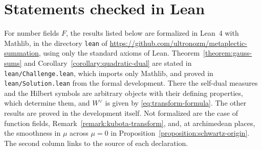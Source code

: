 \documentclass[reqno]{amsart}
\theoremstyle{plain}
\theoremstyle{definition}
\theoremstyle{itplain}
\newcommand{\leanrepo}{https://github.com/ultronozm/metaplectic-summation}
\numberwithin{equation}{section}
\numberwithin{theorem}{section}
\begin{document}
\section{Statements checked in Lean}\label{sec:lean}
\sloppy
For number fields $F$, the results listed below are formalized in Lean~4 with Mathlib, in the directory \texttt{lean} of \url{\leanrepo}, using only the standard axioms of Lean.  Theorem~\ref{theorem:gauss-sums} and Corollary~\ref{corollary:quadratic-dual} are stated in \texttt{lean/Challenge.lean}, which imports only Mathlib, and proved in \texttt{lean/Solution.lean} from the formal development.  There the self-dual measures and the Hilbert symbols are arbitrary objects with their defining properties, which determine them, and $W^\vee$ is given by \eqref{eq:transform-formula}.  The other results are proved in the development itself.  Not formalized are the case of function fields, Remark~\ref{remark:kubota-transform}, and, at archimedean places, the smoothness in $\mu$ across $\mu = 0$ in Proposition~\ref{proposition:schwartz-origin}.  The second column links to the source of each declaration.
\end{document}
